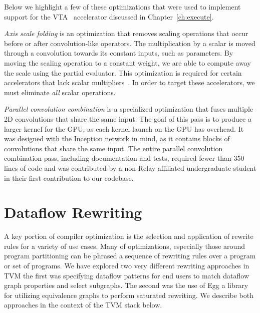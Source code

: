 Below we highlight a few of these optimizations that were used
  to implement support for the VTA~\citep{moreau2018vta} accelerator
  discussed in Chapter~\ref{ch:execute}.

\textit{Axis scale folding} is an optimization that removes scaling
  operations that occur before or after convolution-like operators.
The multiplication by a scalar is moved through a convolution towards
  its constant inputs, such as parameters.
By moving the scaling operation to a constant weight, we are able
  to compute away the scale using the partial evaluator.
This optimization is required for certain accelerators that lack scalar multipliers~\citep{moreau2018vta}.
In order to target these accelerators,
  we must eliminate \textit{all} scalar operations.

\textit{Parallel convolution combination} is a specialized
  optimization that fuses multiple 2D convolutions that share the same input.
The goal of this pass is to produce a larger kernel for the GPU,
  as each kernel launch on the GPU has overhead.
It was designed with the Inception network \citep{inception} in mind, as it
  contains blocks of convolutions that share the same input.
The entire parallel convolution combination pass,
  including documentation and tests,
  required fewer than 350 lines of code and was contributed
  by a non-Relay affiliated undergraduate student
  in their first contribution to our codebase.

\section{Dataflow Rewriting}

A key portion of compiler optimization is
  the selection and application of rewrite rules for a variety
  of use cases.
Many of optimizations, especially those around program partitioning can
  be phrased a sequence of rewriting rules over a program or set of
  programs.
We have explored two very different rewriting approaches in TVM
  the first was specifying dataflow patterns for end users to
  match dataflow graph properties and select subgraphs.
The second was the use of Egg
a library
  for utilizing equivalence graphs to perform saturated rewriting.
We describe both approaches in the context of the TVM stack
  below.

